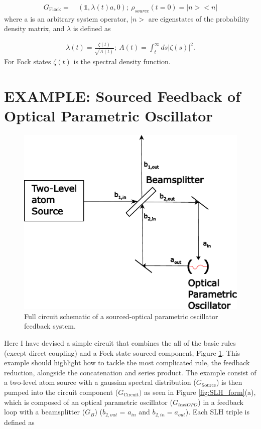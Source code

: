 \documentclass[a4paper]{article}
\begin{document}
\begin{align}
    G_{\text{Flock}} = & \ (\mathbb{1}, \lambda(t)a,0); \ \rho_{source}(t=0)= |n><n|
    \label{eq:sourced_term}
\end{align}
where a is an arbitrary system operator, $|n>$ are eigenstates of the probability density matrix, and $\lambda$ is defined as 

\begin{align*}
    \lambda(t) = \frac{\zeta(t)}{\sqrt{A(t)}} ; \ A(t) = \int_{t}^{\infty} ds |\zeta(s)|^2.
\end{align*}
For Fock states $\zeta(t)$ is the spectral density function.  
\section{EXAMPLE: Sourced Feedback of Optical Parametric Oscillator}


\begin{figure}[H]
\centering
\includegraphics[width = 7.5 cm]{Example_Sourced_feedback.pdf}
\caption{Full circuit schematic of a sourced-optical parametric oscillator feedback system.
}
\label{fig:Example}
\end{figure}  

Here I have devised a simple circuit that combines the all of the basic rules (except direct coupling) and a Fock state sourced component, Figure \ref{fig:Example}. This example should highlight how to tackle the most complicated rule, the feedback reduction, alongside the concatenation and series product. The example consist of a two-level atom source with a gaussian spectral distribution ($G_{\text{Source}} $) is then pumped into the circuit component ($G_{\text{Circuit}})$ as seen in Figure \ref{fig:SLH_form}(a), which is composed of an optical parametric oscillator ($G_{text{OPO}}$) in a feedback loop with a beamsplitter ($G_B$) ($b_{2,out}$ = $a_{in}$ and $b_{2,in} = a_{out}$). Each SLH triple is defined as 
\end{document}
